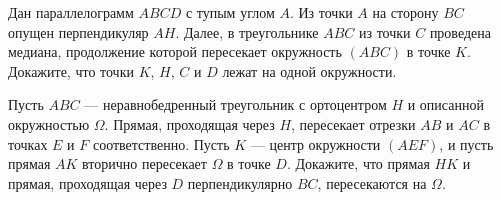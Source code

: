 Дан параллелограмм $ABCD$ с тупым углом $A$. Из точки $A$ на сторону $BC$ опущен перпендикуляр $AH$. Далее, в треугольнике $ABC$ из точки $C$ проведена медиана, продолжение которой пересекает окружность $(ABC)$ в точке $K$. Докажите, что точки $K$, $H$, $C$ и $D$ лежат на одной окружности.


\newpage

\hspace{3mm}

Пусть $ABC$ --- неравнобедренный треугольник с ортоцентром $H$ и описанной окружностью $\Omega$. Прямая, проходящая через $H$, пересекает отрезки $AB$ и $AC$ в точках $E$ и $F$ соответственно. Пусть $K$ --- центр окружности $(AEF)$, и пусть прямая $AK$ вторично пересекает $\Omega$ в точке $D$. Докажите, что прямая $HK$ и прямая, проходящая через $D$ перпендикулярно $BC$, пересекаются на $\Omega.$